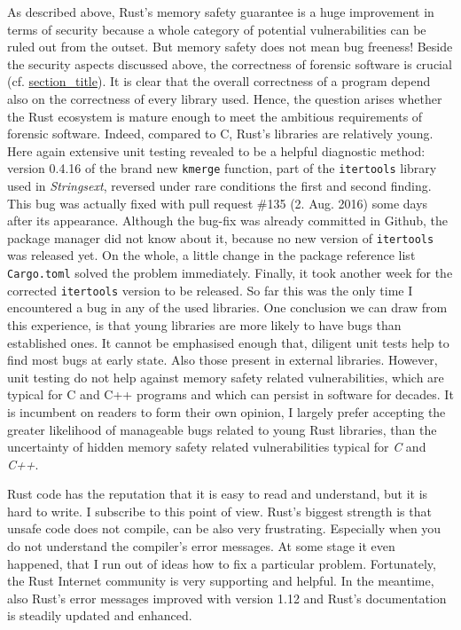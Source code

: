 As described above, Rust's memory safety guarantee is a huge improvement
in terms of security because a whole category of potential
vulnerabilities can be ruled out from the outset. But memory safety does
not mean bug freeness! Beside the security aspects discussed above, the
correctness of forensic software is crucial (cf.
\protect\hyperlink{_tool_validation}{section\_title}). It is clear that
the overall correctness of a program depend also on the correctness of
every library used. Hence, the question arises whether the Rust
ecosystem is mature enough to meet the ambitious requirements of
forensic software. Indeed, compared to C, Rust's libraries are
relatively young. Here again extensive unit testing revealed to be a
helpful diagnostic method: version 0.4.16 of the brand new
\texttt{kmerge} function, part of the \texttt{itertools} library used in
\emph{Strings­ext}, reversed under rare conditions the first and second
finding. This bug was actually fixed with pull request \#135 (2. Aug.
2016) some days after its appearance. Although the bug-fix was already
committed in Github, the package manager did not know about it, because
no new version of \texttt{itertools} was released yet. On the whole, a
little change in the package reference list \texttt{Cargo.toml} solved
the problem immediately. Finally, it took another week for the corrected
\texttt{itertools} version to be released. So far this was the only time
I encountered a bug in any of the used libraries. One conclusion we can
draw from this experience, is that young libraries are more likely to
have bugs than established ones. It cannot be emphasised enough that,
diligent unit tests help to find most bugs at early state. Also those
present in external libraries. However, unit testing do not help against
memory safety related vulnerabilities, which are typical for C and C++
programs and which can persist in software for decades. It is incumbent
on readers to form their own opinion, I largely prefer accepting the
greater likelihood of manageable bugs related to young Rust libraries,
than the uncertainty of hidden memory safety related vulnerabilities
typical for \emph{C} and \emph{C++}.

Rust code has the reputation that it is easy to read and understand, but
it is hard to write. I subscribe to this point of view. Rust's biggest
strength is that unsafe code does not compile, can be also very
frustrating. Especially when you do not understand the compiler's error
messages. At some stage it even happened, that I run out of ideas how to
fix a particular problem. Fortunately, the Rust Internet community is
very supporting and helpful. In the meantime, also Rust's error messages
improved with version 1.12 and Rust's documentation is steadily updated
and enhanced.

